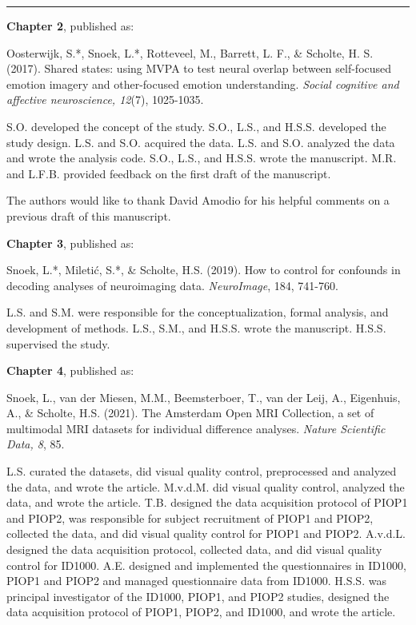\documentclass[11pt,american,]{memoir} %
\begin{document}
\begin{center}\rule{0.5\linewidth}{0.5pt}\end{center}

\textbf{Chapter 2}, published as:

Oosterwijk, S.*, Snoek, L.*, Rotteveel, M., Barrett, L. F., \& Scholte, H. S. (2017). Shared states: using MVPA to test neural overlap between self-focused emotion imagery and other-focused emotion understanding. \emph{Social cognitive and affective neuroscience, 12}(7), 1025-1035.

S.O. developed the concept of the study. S.O., L.S., and H.S.S. developed the study design. L.S. and S.O. acquired the data. L.S. and S.O. analyzed the data and wrote the analysis code. S.O., L.S., and H.S.S. wrote the manuscript. M.R. and L.F.B. provided feedback on the first draft of the manuscript.

The authors would like to thank David Amodio for his helpful comments on a previous draft of this manuscript.

\textbf{Chapter 3}, published as:

Snoek, L.*, Miletić, S.*, \& Scholte, H.S. (2019). How to control for confounds in decoding analyses of neuroimaging data. \emph{NeuroImage}, 184, 741-760.

L.S. and S.M. were responsible for the conceptualization, formal analysis, and development of methods. L.S., S.M., and H.S.S. wrote the manuscript. H.S.S. supervised the study.

\textbf{Chapter 4}, published as:

Snoek, L., van der Miesen, M.M., Beemsterboer, T., van der Leij, A., Eigenhuis, A., \& Scholte, H.S. (2021). The Amsterdam Open MRI Collection, a set of multimodal MRI datasets for individual difference analyses. \emph{Nature Scientific Data, 8}, 85.

L.S. curated the datasets, did visual quality control, preprocessed and analyzed the data, and wrote the article. M.v.d.M. did visual quality control, analyzed the data, and wrote the article. T.B. designed the data acquisition protocol of PIOP1 and PIOP2, was responsible for subject recruitment of PIOP1 and PIOP2, collected the data, and did visual quality control for PIOP1 and PIOP2. A.v.d.L. designed the data acquisition protocol, collected data, and did visual quality control for ID1000. A.E. designed and implemented the questionnaires in ID1000, PIOP1 and PIOP2 and managed questionnaire data from ID1000. H.S.S. was principal investigator of the ID1000, PIOP1, and PIOP2 studies, designed the data acquisition protocol of PIOP1, PIOP2, and ID1000, and wrote the article.
\end{document}
